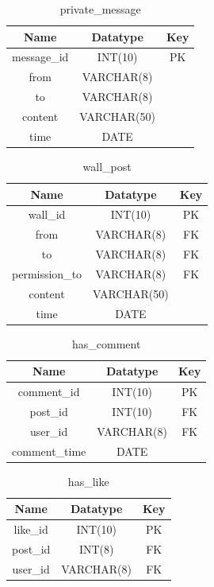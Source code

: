 \begin{table}[!ht]
\caption{private\_message}
\centering
\begin{tabular}{c c c}
\hline\hline
Name               & Datatype    & Key \\
\hline
message\_id        & INT(10)     & PK  \\
from               & VARCHAR(8)  &     \\
to                 & VARCHAR(8)  &     \\
content            & VARCHAR(50) &     \\
time               & DATE        &     \\
\hline
\end{tabular}
\label{table:nonlin}
\end{table}

\begin{table}[!ht]
\caption{wall\_post}
\centering
\begin{tabular}{c c c}
\hline\hline
Name                    & Datatype    & Key \\
\hline
wall\_id                & INT(10)     & PK  \\
from                    & VARCHAR(8)  & FK  \\
to                      & VARCHAR(8)  & FK  \\
permission\_to          & VARCHAR(8)  & FK  \\
content                 & VARCHAR(50) &     \\
time                    & DATE        &     \\
\hline
\end{tabular}
\label{table:nonlin}
\end{table}

\begin{table}[!ht]
\caption{has\_comment}
\centering
\begin{tabular}{c c c}
\hline\hline
Name               & Datatype    & Key \\
\hline
comment\_id        & INT(10)     & PK  \\
post\_id           & INT(10)     & FK  \\
user\_id           & VARCHAR(8)  & FK  \\
comment\_time      & DATE        &     \\
\hline
\end{tabular}
\label{table:nonlin}
\end{table}

\begin{table}[!ht]
\caption{has\_like}
\centering
\begin{tabular}{c c c}
\hline\hline
Name               & Datatype    & Key \\
\hline
like\_id           & INT(10)     & PK  \\
post\_id           & INT(8)      & FK  \\
user\_id           & VARCHAR(8)  & FK  \\
\hline
\end{tabular}
\label{table:nonlin}
\end{table}

